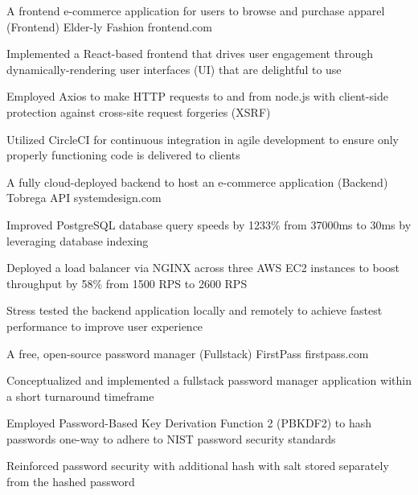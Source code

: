 

\begin{cventries}

  \cventry
    {A frontend e-commerce application for users to browse and purchase apparel (Frontend)} %
    {Elder-ly Fashion} %
    {frontend.com} %
    {} %
    {
      \begin{cvitems} %
        \item {Implemented a React-based frontend that drives user engagement through dynamically-rendering user interfaces (UI) that are delightful to use}
        \item {Employed Axios to make HTTP requests to and from node.js with client-side protection against cross-site request forgeries (XSRF)}
        \item {Utilized CircleCI for continuous integration in agile development to ensure only properly functioning code is delivered to clients}
      \end{cvitems}
    }

  \cventry
    {A fully cloud-deployed backend to host an e-commerce application (Backend)} %
    {Tobrega API} %
    {systemdesign.com} %
    {} %
    {
      \begin{cvitems} %
        \item {Improved PostgreSQL database query speeds by 1233\% from 37000ms to 30ms by leveraging database indexing}
        \item {Deployed a load balancer via NGINX across three AWS EC2 instances to boost throughput by 58\% from 1500 RPS to 2600 RPS}
        \item {Stress tested the backend application locally and remotely to achieve fastest performance to improve user experience}
      \end{cvitems}
    }

  \cventry
    {A free, open-source password manager (Fullstack)} %
    {FirstPass} %
    {firstpass.com} %
    {} %
    {
      \begin{cvitems} %
        \item {Conceptualized and implemented a fullstack password manager application within a short turnaround timeframe}
        \item {Employed Password-Based Key Derivation Function 2 (PBKDF2) to hash passwords one-way to adhere to NIST password security standards}
        \item {Reinforced password security with additional hash with salt stored separately from the hashed password}
      \end{cvitems}
    }


\end{cventries}
